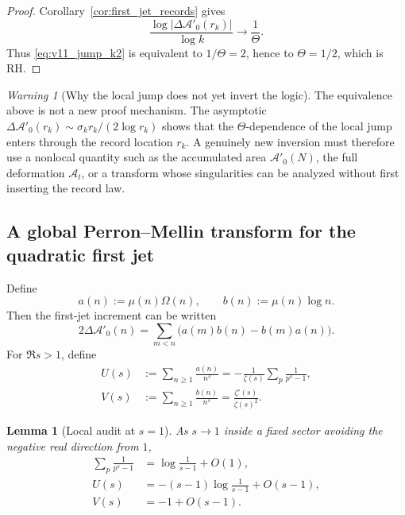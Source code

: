 \documentclass[11pt]{amsart}
\numberwithin{equation}{section}
\theoremstyle{plain}
\newtheorem{lemma}[theorem]{Lemma}
\theoremstyle{definition}
\theoremstyle{remark}
\newtheorem{warning}[theorem]{Warning}
\begin{document}
\begin{proof}
Corollary~\ref{cor:first_jet_records} gives
\begin{equation}
\frac{\log|\Delta\mathcal A'_0(r_k)|}{\log k}\to\frac1\Theta.
\label{eq:v11_jump_theta_again}
\end{equation}
Thus \eqref{eq:v11_jump_k2} is equivalent to \(1/\Theta=2\), hence to
\(\Theta=1/2\), which is RH.
\end{proof}

\begin{warning}[Why the local jump does not yet invert the logic]
\label{warn:v11_jump_shadow}
The equivalence above is not a new proof mechanism.  The asymptotic
\(\Delta\mathcal A'_0(r_k)\sim\sigma_k r_k/(2\log r_k)\) shows that the
\(\Theta\)-dependence of the local jump enters through the record location
\(r_k\).  A genuinely new inversion must therefore use a nonlocal quantity
such as the accumulated area \(\mathcal A'_0(N)\), the full deformation
\(\mathcal A_t\), or a transform whose singularities can be analyzed without
first inserting the record law.
\end{warning}

\subsection{A global Perron--Mellin transform for the quadratic first jet}
\label{subsec:v11_global_Perron}

Define
\begin{equation}
a(n):=\mu(n)\Omega(n),
\qquad
b(n):=\mu(n)\log n.
\label{eq:v11_ab_sequences}
\end{equation}
Then the first-jet increment can be written
\begin{equation}
2\Delta\mathcal A'_0(n)
=\sum_{m<n}\bigl(a(m)b(n)-b(m)a(n)\bigr).
\label{eq:v11_firstjet_ordered_area}
\end{equation}
For \(\Re s>1\), define
\begin{align}
U(s)
&:=\sum_{n\ge1}\frac{a(n)}{n^s}
=-\frac1{\zeta(s)}\sum_p\frac1{p^s-1},
\label{eq:v11_Us}\\
V(s)
&:=\sum_{n\ge1}\frac{b(n)}{n^s}
=\frac{\zeta'(s)}{\zeta(s)^2}.
\label{eq:v11_Vs}
\end{align}


\begin{lemma}[Local audit at \(s=1\)]
\label{lem:v12_UV_at_one}
As \(s\to1\) inside a fixed sector avoiding the negative real direction from
\(1\),
\begin{align}
\sum_p\frac1{p^s-1}
&=\log\frac1{s-1}+O(1),
\label{eq:v12_P1_near_one}\\
U(s)
&=-(s-1)\log\frac1{s-1}+O(s-1),
\label{eq:v12_U_near_one}\\
V(s)
&=-1+O(s-1).
\label{eq:v12_V_near_one}
\end{align}
\end{lemma}
\end{document}
